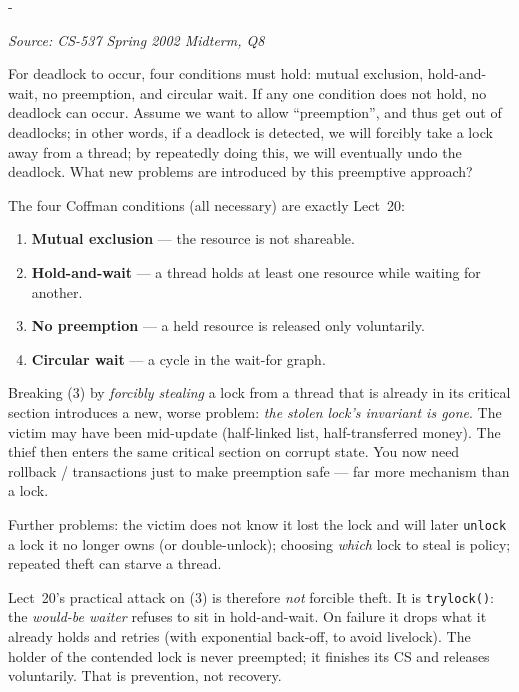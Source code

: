 \documentclass[11pt,a4paper]{article}
\makeatletter
\newcommand{\keepspace}[1]{\par\penalty-100\begingroup
  \setlength{\dimen@}{#1}\dimen@ii\pagegoal\advance\dimen@ii-\pagetotal
  \ifdim\dimen@>\dimen@ii\ifdim\dimen@ii>\z@\vfil\fi\break\fi\endgroup}
\newcounter{qn}[section]
\newenvironment{Qn}[4]{%
  \refstepcounter{qn}\keepspace{7\baselineskip}%
  \begin{tcolorbox}[qboxstyle, title={Q\thesection.\theqn\ \ [#1 \textbar\ #2]\ \ #4}]%
  {\footnotesize\color{g3}\textit{Source: #3}}\par\smallskip%
}{%
  \end{tcolorbox}%
}
\newenvironment{Sol}{%
  \begin{tcolorbox}[sboxstyle, title={Solution}]%
}{%
  \end{tcolorbox}\vspace{0.35em}%
}
\makeatother
\begin{document}
\begin{Qn}{Medium-Hard}{Lect 20}{CS-537 Spring 2002 Midterm, Q8}{Four Coffman conditions, and the problems of lock preemption}
For deadlock to occur, four conditions must hold: mutual exclusion,
hold-and-wait, no preemption, and circular wait. If any one condition does
not hold, no deadlock can occur. Assume we want to allow ``preemption'',
and thus get out of deadlocks; in other words, if a deadlock is detected,
we will forcibly take a lock away from a thread; by repeatedly doing this,
we will eventually undo the deadlock. What new problems are introduced by
this preemptive approach?
\end{Qn}
\begin{Sol}
The four Coffman conditions (all necessary) are exactly Lect~20:
\begin{enumerate}
  \item \textbf{Mutual exclusion} --- the resource is not shareable.
  \item \textbf{Hold-and-wait} --- a thread holds at least one resource
        while waiting for another.
  \item \textbf{No preemption} --- a held resource is released only
        voluntarily.
  \item \textbf{Circular wait} --- a cycle in the wait-for graph.
\end{enumerate}
Breaking (3) by \emph{forcibly stealing} a lock from a thread that is
already in its critical section introduces a new, worse problem:
\emph{the stolen lock's invariant is gone}. The victim may have been
mid-update (half-linked list, half-transferred money). The thief then
enters the same critical section on corrupt state. You now need rollback
/ transactions just to make preemption safe --- far more mechanism than a
lock.

Further problems: the victim does not know it lost the lock and will
later \texttt{unlock} a lock it no longer owns (or double-unlock);
choosing \emph{which} lock to steal is policy; repeated theft can starve
a thread.

Lect~20's practical attack on (3) is therefore \emph{not} forcible theft.
It is \texttt{trylock()}: the \emph{would-be waiter} refuses to sit in
hold-and-wait. On failure it drops what it already holds and retries
(with exponential back-off, to avoid livelock). The holder of the
contended lock is never preempted; it finishes its CS and releases
voluntarily. That is prevention, not recovery.
\end{Sol}
\end{document}
